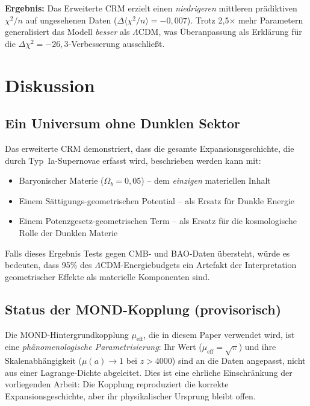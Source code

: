 \documentclass[aps,prd,twocolumn,superscriptaddress,nofootinbib]{revtex4-2}
\begin{document}
\textbf{Ergebnis:} Das Erweiterte CRM erzielt einen \textit{niedrigeren} mittleren pr\"adiktiven $\chi^2/n$ auf ungesehenen Daten ($\Delta\langle\chi^2/n\rangle = -0{,}007$). Trotz 2{,}5$\times$ mehr Parametern generalisiert das Modell \textit{besser} als $\Lambda$CDM, was \"Uberanpassung als Erkl\"arung f\"ur die $\Delta\chi^2 = -26{,}3$-Verbesserung ausschlie\ss{}t.

\section{Diskussion}
\label{sec:discussion}

\subsection{Ein Universum ohne Dunklen Sektor}

Das erweiterte CRM demonstriert, dass die gesamte Expansionsgeschichte, die durch Typ~Ia-Supernovae erfasst wird, beschrieben werden kann mit:
\begin{itemize}
\item Baryonischer Materie ($\Omega_b = 0{,}05$) -- dem \textit{einzigen} materiellen Inhalt
\item Einem S\"attigungs-geometrischen Potential -- als Ersatz f\"ur Dunkle Energie
\item Einem Potenzgesetz-geometrischen Term -- als Ersatz f\"ur die kosmologische Rolle der Dunklen Materie
\end{itemize}

Falls dieses Ergebnis Tests gegen CMB- und BAO-Daten \"ubersteht, w\"urde es bedeuten, dass 95\% des $\Lambda$CDM-Energiebudgets ein Artefakt der Interpretation geometrischer Effekte als materielle Komponenten sind.

\subsection{Status der MOND-Kopplung (provisorisch)}
\label{subsec:mond_status}

Die MOND-Hintergrundkopplung $\mu_{\mathrm{eff}}$, die in diesem Paper verwendet wird, ist eine \emph{ph\"anomenologische Parametrisierung}: Ihr Wert ($\mu_{\mathrm{eff}} = \sqrt{\pi}$) und ihre Skalenabh\"angigkeit ($\mu(a) \to 1$ bei $z > 4000$) sind an die Daten angepasst, nicht aus einer Lagrange-Dichte abgeleitet. Dies ist eine ehrliche Einschr\"ankung der vorliegenden Arbeit: Die Kopplung reproduziert die korrekte Expansionsgeschichte, aber ihr physikalischer Ursprung bleibt offen.
\end{document}
